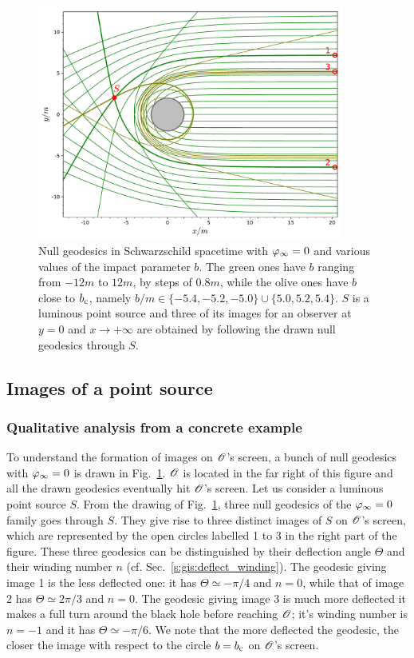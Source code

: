 \begin{figure}
\centerline{\includegraphics[width=0.9\textwidth]{ges_mult_images.pdf}}
\caption[]{\label{f:gis:mult_images} \footnotesize
Null geodesics in Schwarzschild spacetime with $\varphi_\infty=0$ and various values of the impact parameter $b$.
The green ones have $b$ ranging from $-12 m$ to $12 m$, by steps of
$0.8 m$, while the olive ones have $b$ close to $b_{\rm c}$,
namely $b/m\in\{-5.4,-5.2,-5.0\} \cup \{5.0, 5.2, 5.4\}$. $S$ is a luminous point source
and three of its images for an observer at $y=0$ and $x\to + \infty$ are obtained by
following the drawn null geodesics through $S$.}
\end{figure}

\subsection{Images of a point source}


\subsubsection{Qualitative analysis from a concrete example}

To understand the formation of images on $\mathscr{O}$'s screen, a bunch of null
geodesics with $\varphi_\infty=0$ is drawn in Fig.~\ref{f:gis:mult_images}.
$\mathscr{O}$ is located in the far right of this figure and
all the drawn geodesics eventually hit $\mathscr{O}$'s screen. Let us consider a luminous point source
$S$. From the drawing of Fig.~\ref{f:gis:mult_images},
three null geodesics of the $\varphi_\infty=0$ family goes through $S$. They give rise to
three distinct images of $S$ on $\mathscr{O}$'s screen, which are represented by the
open circles labelled 1 to 3 in the right part of the figure. These three
geodesics can be distinguished by their deflection angle $\Theta$
and their winding number $n$ (cf. Sec.~\ref{s:gis:deflect_winding}).
The geodesic giving image 1 is the less deflected one: it has $\Theta \simeq - \pi/4$
and $n=0$, while that
of image 2 has $\Theta\simeq 2\pi/3$ and $n=0$.
The geodesic giving image 3 is much more deflected
it makes a full turn around
the black hole before reaching $\mathscr{O}$; it's winding number is $n=-1$ and
it has $\Theta\simeq -\pi/6$.
We note that the more deflected the geodesic,
the closer the image with respect to the circle $b = b_{\rm c}$ on $\mathscr{O}$'s
screen.

